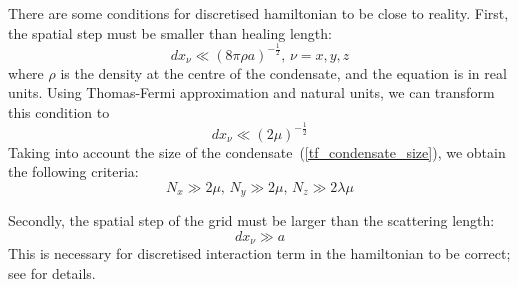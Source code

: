 \documentclass[12pt,notitlepage]{report}
\begin{document}
There are some conditions for discretised hamiltonian to be close to reality.
First, the spatial step must be smaller than healing length:
\[ dx_\nu \ll \left( 8 \pi \rho a \right)^{-\frac{1}{2}},\, \nu = x,y,z \]
where $\rho$ is the density at the centre of the condensate, and the equation is in real units.
Using Thomas-Fermi approximation and natural units, we can transform this condition to
\[ dx_\nu \ll \left( 2 \mu \right)^{-\frac{1}{2}} \]
Taking into account the size of the condensate~(\ref{tf_condensate_size}), we obtain the following criteria:
\begin{equation}
\label{grid_size_criteria}
N_x \gg 2 \mu,\, N_y \gg 2 \mu,\, N_z \gg 2 \lambda \mu
\end{equation}

Secondly, the spatial step of the grid must be larger than the scattering length:
\[ dx_\nu \gg a \]
This is necessary for discretised interaction term in the hamiltonian to be correct; see \cite{0953-4075-35-17-301} for details.
\end{document}
